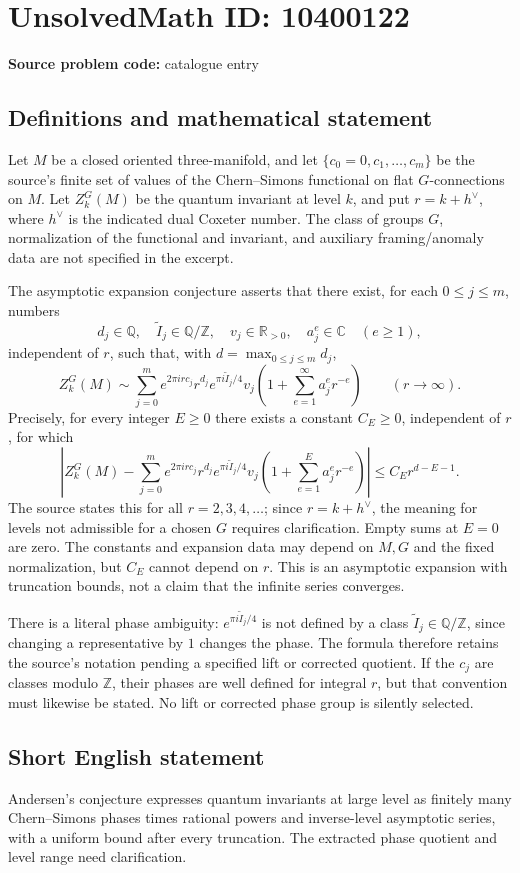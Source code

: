 \documentclass[11pt]{article}
\newcommand{\Z}{\mathbb{Z}}
\newcommand{\Q}{\mathbb{Q}}
\newcommand{\R}{\mathbb{R}}
\newcommand{\C}{\mathbb{C}}
\begin{document}
\section*{UnsolvedMath ID: 10400122}
\textbf{Source problem code:} catalogue entry
\subsection{Definitions and mathematical statement}
Let \(M\) be a closed oriented three-manifold, and let \(\{c_0=0,c_1,\ldots,c_m\}\) be the source's finite set of values of the Chern--Simons functional on flat \(G\)-connections on \(M\). Let \(Z_k^G(M)\) be the quantum invariant at level \(k\), and put \(r=k+h^\vee\), where \(h^\vee\) is the indicated dual Coxeter number. The class of groups \(G\), normalization of the functional and invariant, and auxiliary framing/anomaly data are not specified in the excerpt.

The asymptotic expansion conjecture asserts that there exist, for each \(0\leq j\leq m\), numbers
\[d_j\in\Q,\quad\widetilde I_j\in\Q/\Z,\quad v_j\in\R_{>0},\quad a_j^e\in\C\quad(e\geq1),\]
independent of \(r\), such that, with \(d=\max_{0\leq j\leq m}d_j\),
\[Z_k^G(M)\sim\sum_{j=0}^m e^{2\pi i r c_j}r^{d_j}e^{\pi i\widetilde I_j/4}v_j
\left(1+\sum_{e=1}^{\infty}a_j^e r^{-e}\right)\qquad(r\to\infty).\]
Precisely, for every integer \(E\geq0\) there exists a constant \(C_E\geq0\), independent of \(r\), for which
\[\left|Z_k^G(M)-\sum_{j=0}^m e^{2\pi i r c_j}r^{d_j}e^{\pi i\widetilde I_j/4}v_j
\left(1+\sum_{e=1}^{E}a_j^e r^{-e}\right)\right|
\leq C_E r^{d-E-1}.\]
The source states this for all \(r=2,3,4,\ldots\); since \(r=k+h^\vee\), the meaning for levels not admissible for a chosen \(G\) requires clarification. Empty sums at \(E=0\) are zero. The constants and expansion data may depend on \(M,G\) and the fixed normalization, but \(C_E\) cannot depend on \(r\). This is an asymptotic expansion with truncation bounds, not a claim that the infinite series converges.

There is a literal phase ambiguity: \(e^{\pi i\widetilde I_j/4}\) is not defined by a class \(\widetilde I_j\in\Q/\Z\), since changing a representative by \(1\) changes the phase. The formula therefore retains the source's notation pending a specified lift or corrected quotient. If the \(c_j\) are classes modulo \(\Z\), their phases are well defined for integral \(r\), but that convention must likewise be stated. No lift or corrected phase group is silently selected.
\subsection{Short English statement}
Andersen's conjecture expresses quantum invariants at large level as finitely many Chern--Simons phases times rational powers and inverse-level asymptotic series, with a uniform bound after every truncation. The extracted phase quotient and level range need clarification.
\end{document}
